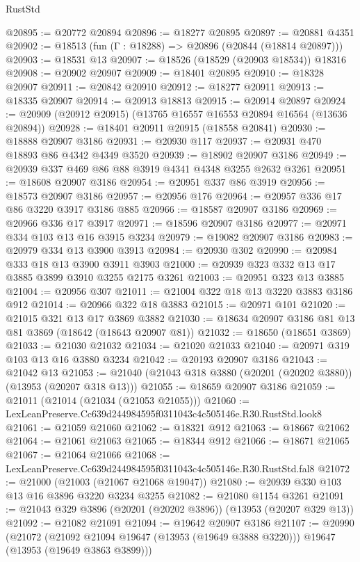 \begin{lexlean}{RustStd}
\begin{coremodule}
@20895 := @20772 @20894
@20896 := @18277 @20895
@20897 := @20881 @4351
@20902 := @18513 (fun (Γ : @18288) => @20896 (@20844 (@18814 @20897)))
@20903 := @18531 @13
@20907 := @18526 (@18529 (@20903 @18534)) @18316
@20908 := @20902 @20907
@20909 := @18401 @20895
@20910 := @18328 @20907
@20911 := @20842 @20910
@20912 := @18277 @20911
@20913 := @18335 @20907
@20914 := @20913 @18813
@20915 := @20914 @20897
@20924 := @20909 (@20912 @20915) (@13765 @16557 @16553 @20894 @16564 (@13636 @20894))
@20928 := @18401 @20911 @20915 (@18558 @20841)
@20930 := @18888 @20907 @3186
@20931 := @20930 @117
@20937 := @20931 @470 @18893 @86 @4342 @4349 @3520
@20939 := @18902 @20907 @3186
@20949 := @20939 @337 @469 @86 @88 @3919 @4341 @4348 @3255 @2632 @3261
@20951 := @18608 @20907 @3186
@20954 := @20951 @337 @86 @3919
@20956 := @18573 @20907 @3186
@20957 := @20956 @176
@20964 := @20957 @336 @17 @86 @3220 @3917 @3186 @885
@20966 := @18587 @20907 @3186
@20969 := @20966 @336 @17 @3917
@20971 := @18596 @20907 @3186
@20977 := @20971 @334 @103 @13 @16 @3915 @3234
@20979 := @19082 @20907 @3186
@20983 := @20979 @334 @13 @3900 @3913
@20984 := @20930 @302
@20990 := @20984 @333 @18 @13 @3900 @3911 @3903
@21000 := @20939 @323 @332 @13 @17 @3885 @3899 @3910 @3255 @2175 @3261
@21003 := @20951 @323 @13 @3885
@21004 := @20956 @307
@21011 := @21004 @322 @18 @13 @3220 @3883 @3186 @912
@21014 := @20966 @322 @18 @3883
@21015 := @20971 @101
@21020 := @21015 @321 @13 @17 @3869 @3882
@21030 := @18634 @20907 @3186 @81 @13 @81 @3869 (@18642 (@18643 @20907 @81))
@21032 := @18650 (@18651 @3869)
@21033 := @21030 @21032
@21034 := @21020 @21033
@21040 := @20971 @319 @103 @13 @16 @3880 @3234
@21042 := @20193 @20907 @3186
@21043 := @21042 @13
@21053 := @21040 (@21043 @318 @3880 (@20201 (@20202 @3880)) (@13953 (@20207 @318 @13)))
@21055 := @18659 @20907 @3186
@21059 := @21011 (@21014 (@21034 (@21053 @21055)))
@21060 := LexLeanPreserve.Cc639d244984595f0311043c4c505146e.R30.RustStd.look8
@21061 := @21059 @21060
@21062 := @18321 @912
@21063 := @18667 @21062
@21064 := @21061 @21063
@21065 := @18344 @912
@21066 := @18671 @21065
@21067 := @21064 @21066
@21068 := LexLeanPreserve.Cc639d244984595f0311043c4c505146e.R30.RustStd.fal8
@21072 := @21000 (@21003 (@21067 @21068 @19047))
@21080 := @20939 @330 @103 @13 @16 @3896 @3220 @3234 @3255
@21082 := @21080 @1154 @3261
@21091 := @21043 @329 @3896 (@20201 (@20202 @3896)) (@13953 (@20207 @329 @13))
@21092 := @21082 @21091
@21094 := @19642 @20907 @3186
@21107 := @20990
    (@21072
      (@21092 @21094 @19647 (@13953 (@19649 @3888 @3220)))
      @19647
      (@13953 (@19649 @3863 @3899)))

\end{coremodule}
\end{lexlean}
